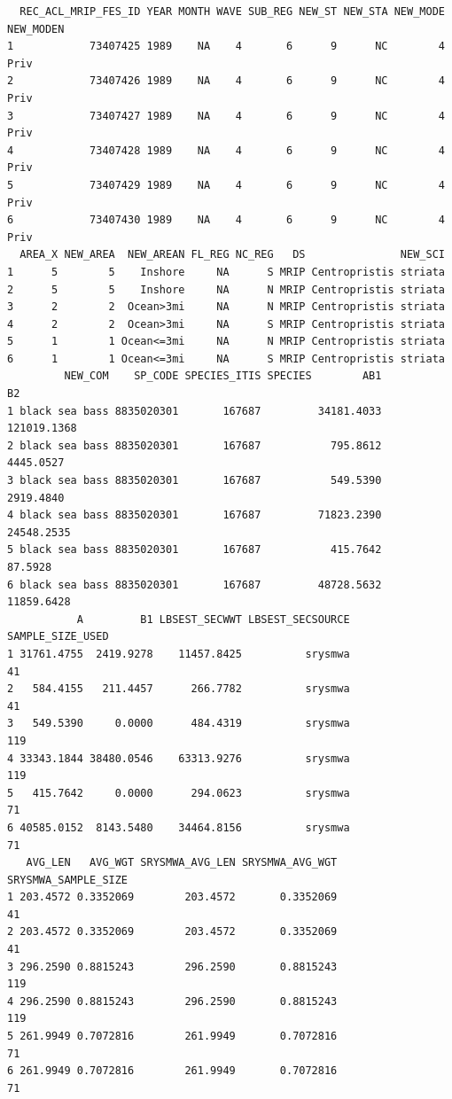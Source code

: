 \documentclass[
  letterpaper,
  oneside,
  open=any]{scrbook}
\begin{document}
\begin{verbatim}
  REC_ACL_MRIP_FES_ID YEAR MONTH WAVE SUB_REG NEW_ST NEW_STA NEW_MODE NEW_MODEN
1            73407425 1989    NA    4       6      9      NC        4      Priv
2            73407426 1989    NA    4       6      9      NC        4      Priv
3            73407427 1989    NA    4       6      9      NC        4      Priv
4            73407428 1989    NA    4       6      9      NC        4      Priv
5            73407429 1989    NA    4       6      9      NC        4      Priv
6            73407430 1989    NA    4       6      9      NC        4      Priv
  AREA_X NEW_AREA  NEW_AREAN FL_REG NC_REG   DS               NEW_SCI
1      5        5    Inshore     NA      S MRIP Centropristis striata
2      5        5    Inshore     NA      N MRIP Centropristis striata
3      2        2  Ocean>3mi     NA      N MRIP Centropristis striata
4      2        2  Ocean>3mi     NA      S MRIP Centropristis striata
5      1        1 Ocean<=3mi     NA      N MRIP Centropristis striata
6      1        1 Ocean<=3mi     NA      S MRIP Centropristis striata
         NEW_COM    SP_CODE SPECIES_ITIS SPECIES        AB1          B2
1 black sea bass 8835020301       167687         34181.4033 121019.1368
2 black sea bass 8835020301       167687           795.8612   4445.0527
3 black sea bass 8835020301       167687           549.5390   2919.4840
4 black sea bass 8835020301       167687         71823.2390  24548.2535
5 black sea bass 8835020301       167687           415.7642     87.5928
6 black sea bass 8835020301       167687         48728.5632  11859.6428
           A         B1 LBSEST_SECWWT LBSEST_SECSOURCE SAMPLE_SIZE_USED
1 31761.4755  2419.9278    11457.8425          srysmwa               41
2   584.4155   211.4457      266.7782          srysmwa               41
3   549.5390     0.0000      484.4319          srysmwa              119
4 33343.1844 38480.0546    63313.9276          srysmwa              119
5   415.7642     0.0000      294.0623          srysmwa               71
6 40585.0152  8143.5480    34464.8156          srysmwa               71
   AVG_LEN   AVG_WGT SRYSMWA_AVG_LEN SRYSMWA_AVG_WGT SRYSMWA_SAMPLE_SIZE
1 203.4572 0.3352069        203.4572       0.3352069                  41
2 203.4572 0.3352069        203.4572       0.3352069                  41
3 296.2590 0.8815243        296.2590       0.8815243                 119
4 296.2590 0.8815243        296.2590       0.8815243                 119
5 261.9949 0.7072816        261.9949       0.7072816                  71
6 261.9949 0.7072816        261.9949       0.7072816                  71

\end{verbatim}
\end{document}

